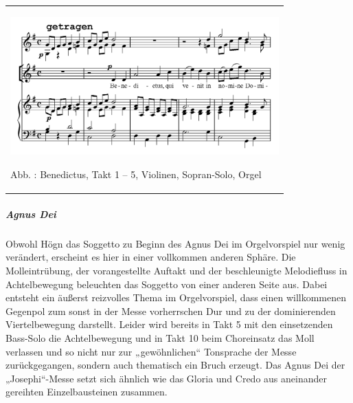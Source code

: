 \documentclass[a4paper]{article}
\newcounter{Abb}
\renewcommand\theAbb{\arabic{Abb}}
\begin{document}
\begin{flushleft}
\tablefirsthead{}
\tablehead{}
\tabletail{}
\tablelasttail{}
\begin{supertabular}{m{10.528cm}}

\includegraphics[width=10.345cm,height=5.313cm]{pictures/zulassungsarbeit-img122.png}

Abb. \stepcounter{Abb}{\theAbb}: Benedictus, Takt 1 – 5, Violinen,
Sopran-Solo, Orgel\\
\end{supertabular}
\end{flushleft}
\clearpage\subparagraph{Agnus Dei}
Obwohl Högn das Soggetto zu Beginn des Agnus Dei im Orgelvorspiel nur
wenig verändert, erscheint es hier in einer vollkommen anderen Sphäre.
Die Molleintrübung, der vorangestellte Auftakt und der beschleunigte
Melodiefluss in Achtelbewegung beleuchten das Soggetto von einer
anderen Seite aus. Dabei entsteht ein äußerst reizvolles Thema im
Orgelvorspiel, dass einen willkommenen Gegenpol zum sonst in der Messe
vorherrschen Dur und zu der dominierenden Viertelbewegung darstellt.
Leider wird bereits in Takt 5 mit den einsetzenden Bass-Solo die
Achtelbewegung und in Takt 10 beim Choreinsatz das Moll verlassen und
so nicht nur zur „gewöhnlichen“ Tonsprache der Messe zurückgegangen,
sondern auch thematisch ein Bruch erzeugt. Das Agnus Dei der
„Josephi“-Messe setzt sich ähnlich wie das Gloria und Credo aus
aneinander gereihten Einzelbausteinen zusammen.
\end{document}
